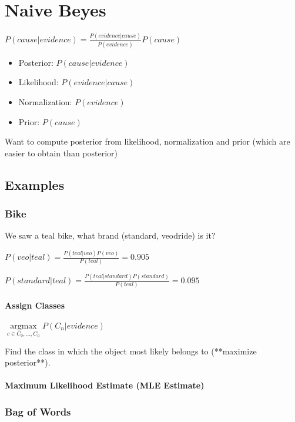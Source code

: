 \section{Naive Beyes}

  $ P(cause | evidence) = \frac{P(evidence | cause)}{P(evidence)} P(cause) $

  \begin{itemize}
    \item Posterior: $ P(cause | evidence) $
    \item Likelihood: $ P(evidence | cause) $
    \item Normalization: $ P(evidence) $
    \item Prior: $ P(cause) $
  \end{itemize}

  Want to compute posterior from likelihood, normalization and prior
  (which are easier to obtain than posterior)

  \subsection{Examples}

    \subsubsection{Bike}

      We saw a teal bike, what brand (standard, veodride) is it?

      $ P(veo | teal) = \frac{P(teal | veo) P(veo)}{P(teal)} = 0.905 $

      $ P(standard | teal) = \frac{P(teal | standard) P(standard)}{P(teal)} = 0.095 $

      \paragraph{Assign Classes}

      $ \underset{c\in C_{0}, ..., C_{n}}{\operatorname{argmax}} P( C_{n} | evidence) $

      Find the class in which the object most likely belongs to (**maximize posterior**).

      \paragraph{Maximum Likelihood Estimate (MLE Estimate)}

    \subsubsection{Bag of Words}


